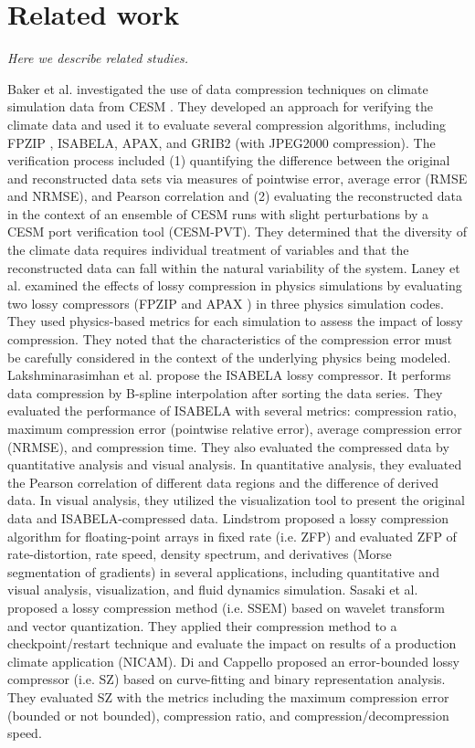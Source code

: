 \section{Related work}

\emph{Here we describe related studies.}

Baker et al. \cite{baker} investigated the use of data compression techniques on climate simulation data from CESM \cite{cesm}. They developed an approach for verifying the climate data and used it to evaluate several compression algorithms, including FPZIP \cite{fpzip}, ISABELA, APAX, and GRIB2 (with JPEG2000 compression). The verification process included (1) quantifying the difference between the original and reconstructed data sets via measures of pointwise error, average error (RMSE and NRMSE), and Pearson correlation and (2) evaluating the reconstructed data in the context of an ensemble of CESM runs with slight perturbations by a CESM port verification tool (CESM-PVT). They determined that the diversity of the climate data requires individual treatment of variables and that the reconstructed data can fall within the natural variability of the system.
Laney et al. \cite{laney2014assessing} examined the effects of lossy compression in physics simulations by evaluating two lossy compressors (FPZIP and APAX \cite{apax}) in three physics simulation codes. They used physics-based metrics for each simulation to assess the impact of lossy compression. They noted that the characteristics of the compression error must be carefully considered in the context of the underlying physics being modeled.
Lakshminarasimhan et  al. \cite{isabela} propose the ISABELA lossy compressor. It performs data compression by B-spline interpolation after sorting the data series. They evaluated the performance of ISABELA with several metrics: compression ratio, maximum compression error (pointwise relative error), average compression error (NRMSE), and compression time. They also evaluated the compressed data by quantitative analysis and visual analysis. In quantitative analysis, they evaluated the Pearson correlation of different data regions and the difference of derived data. In visual analysis, they utilized the visualization tool to present the original data and ISABELA-compressed data.
Lindstrom \cite{zfp} proposed a lossy compression algorithm for floating-point arrays in fixed rate (i.e. ZFP) and evaluated ZFP of rate-distortion, rate speed, density spectrum, and derivatives (Morse segmentation of gradients) in several applications, including quantitative and visual analysis, visualization, and fluid dynamics simulation.
Sasaki et al. \cite{ssem} proposed a lossy compression method (i.e. SSEM) based on wavelet transform and vector quantization. They applied their compression method to a checkpoint/restart technique and evaluate the impact on results of a production climate application (NICAM).
Di and Cappello \cite {sz} proposed an error-bounded lossy compressor (i.e. SZ) based on curve-fitting and binary representation analysis. They evaluated SZ with the metrics including the maximum compression error (bounded or not bounded), compression ratio, and compression/decompression speed.

